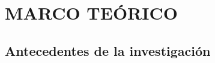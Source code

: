 \documentclass[a4paper]{article}
\begin{document}
\begin{table}[ht]
\begin{center}
\begin{tabular}{>{\centering}m{2.4cm} m{2.2cm}m{2.2cm}m{1.8cm}m{2cm}m{1.7cm}m{1.5cm}m{1.6cm} @{}m{0pt}@{} }


\end{tabular}
\hspace*{-1cm}
\end{center}
\end{table}

\section{MARCO TEÓRICO}\label{marco-teorico}

\subsection{Antecedentes de la
investigación}\label{antecedentes-de-la-investigacion}
\end{document}
